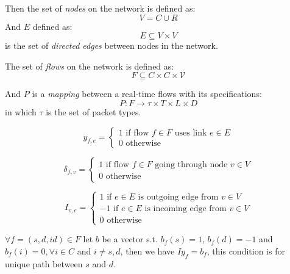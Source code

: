 \documentclass[conference, twocolumn]{IEEEtran}
\theoremstyle{definition}
\begin{document}
Then the set of {\em nodes} on the network is defined as:
\begin{equation}\label{reio}
V = C \cup R
\end{equation}
And $E$ defined as:
\begin{equation}
E \subseteq V \times V 
\end{equation}
is the set of {\em directed edges} between nodes in the network.

The set of {\em flows} on the network is defined as:
\begin{equation}
F \subseteq C \times C \times \mathcal{V} 
\end{equation}

And $P$ is a {\em mapping } between a real-time flows with its specifications:
\begin{equation}
P:F \rightarrow \tau \times T \times L \times D
\end{equation}
in which $\tau$ is the set of packet types.

\begin{equation}
y_{f,e} = \left\{ \begin{array}{lrc}
1 \mbox{ if flow } f \in F \mbox{ uses link } e \in E \\
0 \mbox{ otherwise} 
\end{array}\right.
\end{equation}

\begin{equation}
\delta_{f,v} = \left\{ \begin{array}{lrc}
1 \mbox{ if flow } f \in F \mbox{ going through node } v \in V \\
0 \mbox{ otherwise} 
\end{array}\right.
\end{equation}

\begin{equation}
I_{v,e} = \left\{ \begin{array}{lrc}
1 \mbox{ if } e \in E \mbox{ is outgoing edge from } v \in V \\
-1 \mbox{ if } e \in E \mbox{ is incoming edge from } v \in V \\
0 \mbox{ otherwise}
\end{array}\right. 
\end{equation}

$\forall f=(s, d, id) \in F$  let $b$ be a vector s.t. $b_f(s) = 1$, 
$b_f(d) = -1$ and $b_f(i) = 0, \forall i \in C \mbox{ and } i \neq s, d$,
 then we have $Iy_f=b_f$, this condition is for unique path between $s$ and $d$.
\end{document}
